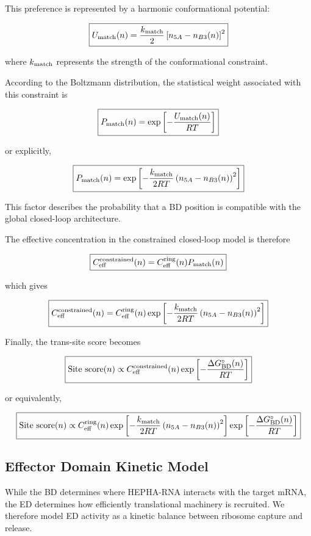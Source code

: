 \documentclass{article}
\begin{document}
This preference is represented by a harmonic conformational
potential:

\[
\boxed{
U_{\rm match}(n)
=
\frac{k_{\rm match}}{2}
\left[
n_{5A}
-
n_{B3}(n)
\right]^2
}
\]

where \(k_{\rm match}\) represents the strength of the
conformational constraint.

According to the Boltzmann distribution, the statistical weight
associated with this constraint is

\[
\boxed{
P_{\rm match}(n)
=
\exp\left[
-\frac{
U_{\rm match}(n)
}{RT}
\right]
}
\]

or explicitly,

\[
\boxed{
P_{\rm match}(n)
=
\exp\left[
-\frac{
k_{\rm match}
}{
2RT
}
\left(
n_{5A}
-
n_{B3}(n)
\right)^2
\right]
}
\]

This factor describes the probability that a BD position is
compatible with the global closed-loop architecture.

The effective concentration in the constrained closed-loop model
is therefore

\[
\boxed{
C_{\rm eff}^{\rm constrained}(n)
=
C_{\rm eff}^{\rm ring}(n)
P_{\rm match}(n)
}
\]

which gives

\[
\boxed{
C_{\rm eff}^{\rm constrained}(n)
=
C_{\rm eff}^{\rm ring}(n)
\exp\left[
-\frac{
k_{\rm match}
}{
2RT
}
\left(
n_{5A}
-
n_{B3}(n)
\right)^2
\right]
}
\]

Finally, the trans-site score becomes

\[
\boxed{
\text{Site score}(n)
\propto
C_{\rm eff}^{\rm constrained}(n)
\exp\left[
-\frac{\Delta G_{\rm BD}^{\circ}(n)}
{RT}
\right]
}
\]

or equivalently,

\[
\boxed{
\text{Site score}(n)
\propto
C_{\rm eff}^{\rm ring}(n)
\exp\left[
-\frac{
k_{\rm match}
}{
2RT
}
\left(
n_{5A}
-
n_{B3}(n)
\right)^2
\right]
\exp\left[
-\frac{\Delta G_{\rm BD}^{\circ}(n)}
{RT}
\right]
}
\]

\subsection{Effector Domain Kinetic Model}

While the BD determines where HEPHA-RNA interacts with the target mRNA, the ED determines how efficiently translational machinery is recruited. We therefore model ED activity as a kinetic balance between ribosome capture and release.
\end{document}
